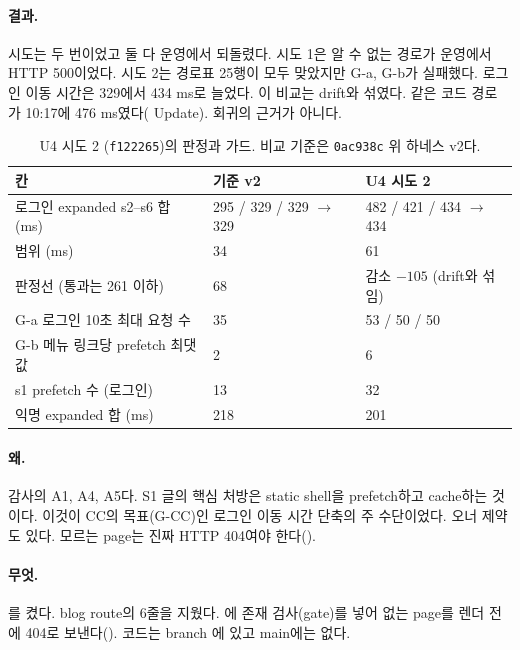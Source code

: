 \paragraph{결과.}
시도는 두 번이었고 둘 다 운영에서 되돌렸다.
시도 1은 알 수 없는 경로가 운영에서 HTTP 500이었다.
시도 2는 경로표 25행이 모두 맞았지만 G-a, G-b가 실패했다. 로그인 이동 시간은 329에서 434 ms로 늘었다.
이 비교는 drift와 섞였다. 같은 코드 경로 가 10:17에 476 ms였다( Update). 회귀의 근거가 아니다.
\begin{table}[H]
  \caption{U4 시도 2 (\texttt{f122265})의 판정과 가드. 비교 기준은 \texttt{0ac938c} 위 하네스 v2다.}
  \label{tab:re-u4}
  \centering\small
  \begin{tabularx}{\linewidth}{@{}Y L{2.6cm} L{2.6cm}@{}}
    \toprule
    칸 & 기준 v2 & U4 시도 2 \\
    \midrule
    로그인 expanded s2--s6 합 (ms) & 295 / 329 / 329 $\to$ 329 & 482 / 421 / 434 $\to$ 434 \\
    \midrule
    범위 (ms) & 34 & 61 \\
    \midrule
    판정선 (통과는 261 이하) & 68 & 감소 $-105$ (drift와 섞임) \\
    \midrule
    G-a 로그인 10초 최대 요청 수 & 35 & 53 / 50 / 50 \\
    \midrule
    G-b 메뉴 링크당 prefetch 최댓값 & 2 & 6 \\
    \midrule
    s1 prefetch 수 (로그인) & 13 & 32 \\
    \midrule
    익명 expanded 합 (ms) & 218 & 201 \\
    \bottomrule
  \end{tabularx}
\end{table}

\paragraph{왜.}
감사의 A1, A4, A5다. S1 글의 핵심 처방은 static shell을 prefetch하고 cache하는 것이다.
이것이 CC의 목표(G-CC)인 로그인 이동 시간 단축의 주 수단이었다.
오너 제약도 있다. 모르는 page는 진짜 HTTP 404여야 한다().

\paragraph{무엇.}
를 켰다. blog route의  6줄을 지웠다.
에 존재 검사(gate)를 넣어 없는 page를 렌더 전에 404로 보낸다().
코드는 branch 에 있고 main에는 없다.

